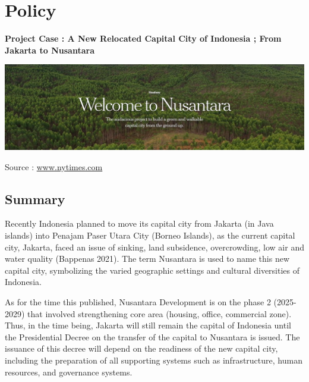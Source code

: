 \documentclass[
  letterpaper,
  DIV=11,
  numbers=noendperiod]{scrreprt}
\begin{document}

\hypertarget{policy}{%
\chapter{Policy}\label{policy}}

\textbf{Project Case : A New Relocated Capital City of Indonesia ; From
Jakarta to Nusantara}

\includegraphics[width=9.82292in,height=\textheight]{images/clipboard-546673402.png}

Source :
\href{https://www.nytimes.com/interactive/2023/05/16/headway/indonesia-nusantara-jakarta.html}{www.nytimes.com}

\hypertarget{summary-3}{%
\section{Summary}\label{summary-3}}

Recently Indonesia planned to move its capital city from Jakarta (in
Java islands) into Penajam Paser Utara City (Borneo Islands), as the
current capital city, Jakarta, faced an issue of sinking, land
subsidence, overcrowding, low air and water quality (Bappenas 2021). The
term Nusantara is used to name this new capital city, symbolizing the
varied geographic settings and cultural diversities of Indonesia.

As for the time this published, Nusantara Development is on the phase 2
(2025-2029) that involved strengthening core area (housing, office,
commercial zone). Thus, in the time being, Jakarta will still remain the
capital of Indonesia until the Presidential Decree on the transfer of
the capital to Nusantara is issued. The issuance of this decree will
depend on the readiness of the new capital city, including the
preparation of all supporting systems such as infrastructure, human
resources, and governance systems.
\end{document}
